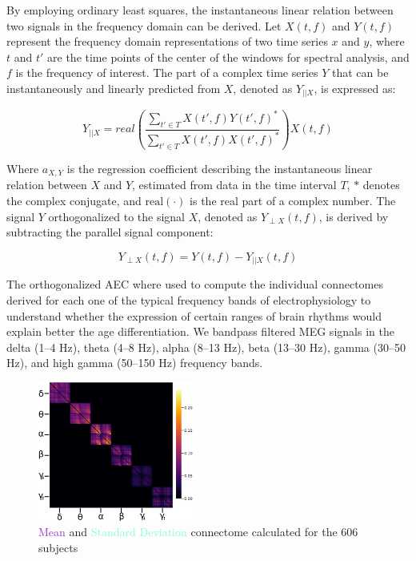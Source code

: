 \documentclass{cys}
\begin{document}
\bigskip
By employing ordinary least squares, the instantaneous linear relation between two signals in the frequency domain can be derived. Let $X(t,f)$ and $Y(t,f)$ represent the frequency domain representations of two time series $x$ and $y$, where $t$ and $t'$ are the time points of the center of the windows for spectral analysis, and $f$ is the frequency of interest. The part of a complex time series $Y$ that can be instantaneously and linearly predicted from $X$, denoted as $Y_{||X}$, is expressed as:
\small

\small
\begin{equation}
Y_{||X} =  real(\frac{\sum_{t'\in T}X(t',f)Y(t',f)^\ast}{\sum_{t'\in T}X(t',f)X(t',f)^\ast}) X(t,f)
\end{equation}

\smallskip
Where $a_{X,Y}$ is the regression coefficient describing the instantaneous linear relation between $X$ and $Y$, estimated from data in the time interval $T$, $\ast$ denotes the complex conjugate, and $\text{real}(\cdot)$ is the real part of a complex number. The signal $Y$ orthogonalized to the signal $X$, denoted as $Y_{\perp X}(t,f)$, is derived by subtracting the parallel signal component:

\begin{equation}
Y_{\perp X}(t,f) = Y(t,f)-Y_{||X}(t,f)
\end{equation}

\smallskip
The orthogonalized AEC where used to compute the individual connectomes derived for each one of the typical frequency bands of electrophysiology to understand whether the expression of certain ranges of brain rhythms would explain better the age differentiation. We bandpass ﬁltered MEG signals in the delta (1–4 Hz), theta (4–8 Hz), alpha (8–13 Hz), beta (13–30 Hz), gamma (30–50 Hz), and high gamma (50–150 Hz) frequency bands. 

\begin{figure}[H]
\centering
	\includegraphics[width=0.47\textwidth]{FCDK}
	\caption{\textcolor{DarkOrchid}{Mean} and \textcolor{Aquamarine}{Standard Deviation} connectome calculated for the 606 subjects}
	\label{FunctionalConnectivity}
\end{figure}
\end{document}
